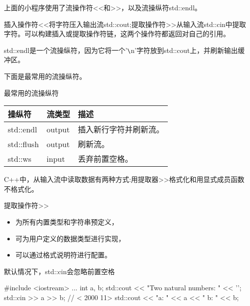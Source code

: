 上面的小程序使用了流操作符<{}<和>{}>，以及流操纵符std::endl。

插入操作符<{}<将字符压入输出流std::cout;提取操作符>{}>从输入流std::cin中提取字符。可以构建插入或提取操作符链，这两个操作符都返回对自己的引用。

std::endl是一个流操纵符，因为它将一个'\verb|\|n'字符放到std::cout上，并刷新输出缓冲区。

下面是最常用的流操纵符。

\begin{center}
最常用的流操纵符
\end{center}

\begin{longtable}[c]{|l|l|l|}
\hline
\textbf{操纵符} & \textbf{流类型} & \textbf{描述}                                 \\ \hline
\endfirsthead
%
\endhead
%
std::endl            & output               & 插入新行字符并刷新流。 \\ \hline
std::flush           & output               & 刷新流。                                  \\ \hline
std::ws              & input                & 丢弃前置空格。                         \\ \hline
\end{longtable}


C++中，从输入流中读取数据有两种方式:用提取器>{}>格式化和用显式成员函数不格式化。


提取操作符>{}>

\begin{itemize}
\item 
为所有内置类型和字符串预定义，

\item 
可为用户定义的数据类型进行实现，

\item 
可以通过格式说明符进行配置。
\end{itemize}

\begin{myTip}{默认情况下，std::cin会忽略前置空格}
\begin{cpp}
#include <iostream>
...
int a, b;
std::cout << "Two natural numbers: " << '\n';
std::cin >> a >> b; // < 2000 11>
std::cout << "a: " << a << " b: " << b;
\end{cpp}
\end{myTip}

